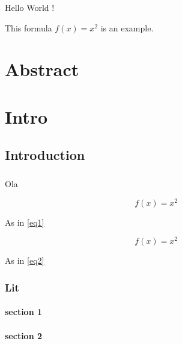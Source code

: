 \documentclass{report}
\begin{document}

\maketitle

\newpage
\tableofcontents

\listoffigures




\newpage


Hello \newpage World !

This formula $f(x) = x^2$ is an example.


\chapter*{Abstract}

\chapter{Intro}

\section{Introduction}

\paragraph{}
Ola

\begin{equation}
  f(x) = x^2
  \label{eq1}
\end{equation}

As in \ref{eq1}

\begin{equation}
  f(x) = x^2
  \label{eq2}
\end{equation}

As in \ref{eq2}



\subsection{Lit}

\subsubsection{ section 1}

\subsubsection{ section 2}
\end{document}
